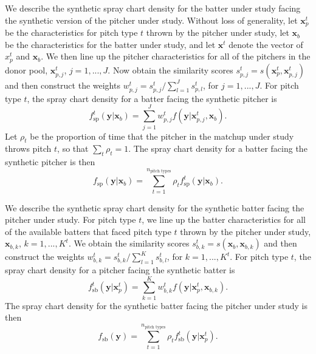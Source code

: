 \documentclass[12pt]{article}
\newcommand{\y}{\textbf{y}}
\newcommand{\x}{\textbf{x}}
\begin{document}
We describe the synthetic spray chart density for the batter under study facing the synthetic version of the pitcher under study. Without loss of generality, let $\x_p^t$ be the characteristics for pitch type $t$ thrown by the pitcher under study, let $\x_b$ be the characteristics for the batter under study, and let $\x^t$ denote the vector of $x_p^t$ and $\x_b$. We then line up the pitcher characteristics for all of the pitchers in the donor pool, $\x_{p,j}^t$, $j = 1,...,J$. Now obtain the similarity scores $s_{p,j}^t = s(\x_p^t,\x_{p,j}^t)$ and then construct the weights $w_{p,j}^t = s_{p,j}^t / \sum_{l=1}^{J}s_{p,l}^t$, for $j = 1,...,J$. For pitch type $t$, the spray chart density for a batter facing the synthetic pitcher is 
\begin{equation} \label{synth-pitch-t}
  f_{\text{sp}}^t(\y|\x_b) = \sum_{j=1}^J w_{p,j}^tf(\y|\x_{p,j}^t,\x_b).
\end{equation}
Let $\rho_t$ be the proportion of time that the pitcher in the matchup under study throws pitch $t$, so that $\sum_t \rho_t = 1$. The spray chart density for a batter facing the synthetic pitcher is then
\begin{equation} \label{synth-pitch}
  f_{\text{sp}}(\y|\x_b) = \sum_{t=1}^{n_{\text{pitch types}}} \rho_t f_{\text{sp}}^t(\y|\x_b).
\end{equation}


We describe the synthetic spray chart density for the synthetic batter facing the pitcher under study. For pitch type $t$, we line up the batter characteristics for all of the available batters that faced pitch type $t$ thrown by the pitcher under study, $\x_{b,k}$, $k = 1,...,K^t$.  We obtain the similarity scores $s_{b,k}^t = s(\x_b,\x_{b,k})$ and then construct the weights $w_{b,k}^t = s_{b,k}^t / \sum_{l=1}^{K}s_{b,l}^t$, for $k = 1,...,K^t$. For pitch type $t$, the spray chart density for a pitcher facing the synthetic batter is 
\begin{equation} \label{synth-bat-t}
  f_{\text{sb}}^t(\y|\x_p^t) = \sum_{k=1}^K w_{b,k}^tf(\y|\x_p^t,\x_{b,k}).
\end{equation}
The spray chart density for the synthetic batter facing the pitcher under study is then
\begin{equation} \label{synth-bat}
  f_{\text{sb}}(\y) = \sum_{t=1}^{n_{\text{pitch types}}} \rho_t f_{\text{sb}}^t(\y|\x_p^t).
\end{equation}
\end{document}
